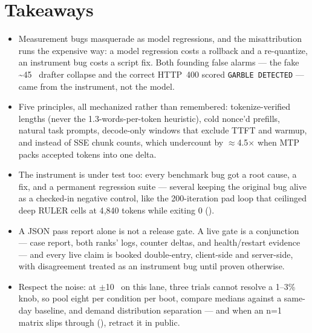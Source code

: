 \FloatBarrier
\section*{Takeaways}

\begin{itemize}
\item Measurement bugs masquerade as model regressions, and the
  misattribution runs the expensive way: a model regression costs a
  rollback and a re-quantize, an instrument bug costs a script fix. Both
  founding false alarms --- the fake \textasciitilde{}45~\tokspersec{}
  drafter collapse and the correct HTTP~400 scored
  \texttt{GARBLE DETECTED} --- came from the instrument, not the model.
\item Five principles, all mechanized rather than remembered:
  tokenize-verified lengths (never the 1.3-words-per-token heuristic),
  cold nonce'd prefills, natural task prompts, decode-only windows that
  exclude TTFT and warmup, and  instead of
  SSE chunk counts, which undercount by $\approx$4.5$\times$ when MTP
  packs accepted tokens into one delta.
\item The instrument is under test too: every benchmark bug got a root
  cause, a fix, and a permanent regression suite --- several keeping the
  original bug alive as a checked-in negative control, like the
  200-iteration pad loop that ceilinged deep RULER cells at 4{,}840
  tokens while exiting 0 ().
\item A JSON pass report alone is not a release gate. A live gate is a
  conjunction --- case report, both ranks' logs, counter deltas, and
  health/restart evidence --- and every live claim is booked double-entry,
  client-side and server-side, with disagreement treated as an instrument
  bug until proven otherwise.
\item Respect the noise: at $\pm$10~\tokspersec{} on this lane, three
  trials cannot resolve a 1--3\% knob, so pool eight per condition per
  boot, compare medians against a same-day baseline, and demand
  distribution separation --- and when an n=1 matrix slips through
  (), retract it in public.
\end{itemize}

